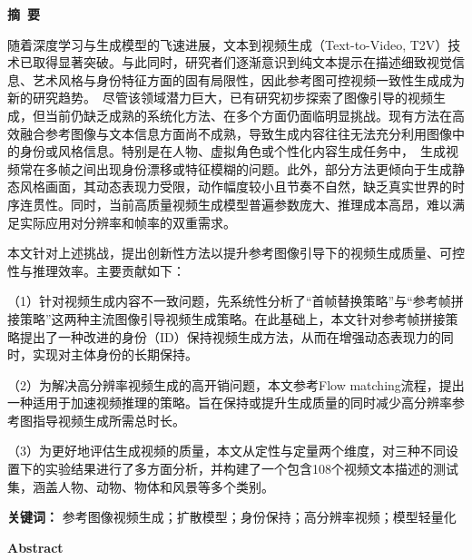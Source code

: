 \cleardoublepage{}
\begin{center}
    \bfseries {} 摘~要
\end{center}

随着深度学习与生成模型的飞速进展，文本到视频生成（Text-to-Video, T2V）技术已取得显著突破。与此同时，研究者们逐渐意识到纯文本提示在描述细致视觉信息、艺术风格与身份特征方面的固有局限性，因此参考图可控视频一致性生成成为新的研究趋势。\
尽管该领域潜力巨大，已有研究初步探索了图像引导的视频生成，但当前仍缺乏成熟的系统化方法、在多个方面仍面临明显挑战。现有方法在高效融合参考图像与文本信息方面尚不成熟，导致生成内容往往无法充分利用图像中的身份或风格信息。特别是在人物、虚拟角色或个性化内容生成任务中，\
生成视频常在多帧之间出现身份漂移或特征模糊的问题。此外，部分方法更倾向于生成静态风格画面，其动态表现力受限，动作幅度较小且节奏不自然，缺乏真实世界的时序连贯性。同时，当前高质量视频生成模型普遍参数庞大、推理成本高昂，难以满足实际应用对分辨率和帧率的双重需求。

本文针对上述挑战，提出创新性方法以提升参考图像引导下的视频生成质量、可控性与推理效率。主要贡献如下：

（1）针对视频生成内容不一致问题，先系统性分析了“首帧替换策略”与“参考帧拼接策略”这两种主流图像引导视频生成策略。在此基础上，本文针对参考帧拼接策略提出了一种改进的身份（ID）保持视频生成方法，从而在增强动态表现力的同时，实现对主体身份的长期保持。

（2）为解决高分辨率视频生成的高开销问题，本文参考Flow matching流程，提出一种适用于加速视频推理的策略。旨在保持或提升生成质量的同时减少高分辨率参考图指导视频生成所需总时长。

（3）为更好地评估生成视频的质量，本文从定性与定量两个维度，对三种不同设置下的实验结果进行了多方面分析，并构建了一个包含108个视频文本描述的测试集，涵盖人物、动物、物体和风景等多个类别。

\vspace{0.5cm} %

\noindent
\textbf{关键词：} 参考图像视频生成；扩散模型；身份保持；高分辨率视频；模型轻量化
\cleardoublepage{}
\begin{center}
    \bfseries {} Abstract
\end{center}

